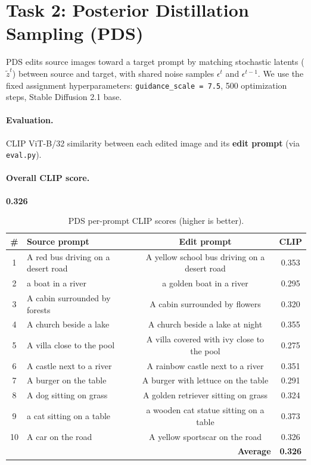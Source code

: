 \documentclass[11pt,a4paper]{article}
\begin{document}
\section{Task 2: Posterior Distillation Sampling (PDS)}

PDS edits source images toward a target prompt by matching stochastic latents
($\tilde{z}^t$) between source and target, with shared noise samples
$\epsilon^t$ and $\epsilon^{t-1}$. We use the fixed assignment hyperparameters:
\texttt{guidance\_scale = 7.5}, 500 optimization steps, Stable Diffusion 2.1 base.

\paragraph{Evaluation.} CLIP ViT-B/32 similarity between each edited image and its
\textbf{edit prompt} (via \texttt{eval.py}).

\paragraph{Overall CLIP score.} \textbf{0.326}

\begin{table}[H]
  \centering
  \caption{PDS per-prompt CLIP scores (higher is better).}
  \label{tab:pds-scores}
  \small
  \begin{tabular}{@{}clcc@{}}
    \toprule
    \# & Source prompt & Edit prompt & CLIP \\
    \midrule
    1  & A red bus driving on a desert road & A yellow school bus driving on a desert road & 0.353 \\
    2  & a boat in a river & a golden boat in a river & 0.295 \\
    3  & A cabin surrounded by forests & A cabin surrounded by flowers & 0.320 \\
    4  & A church beside a lake & A church beside a lake at night & 0.355 \\
    5  & A villa close to the pool & A villa covered with ivy close to the pool & 0.275 \\
    6  & A castle next to a river & A rainbow castle next to a river & 0.351 \\
    7  & A burger on the table & A burger with lettuce on the table & 0.291 \\
    8  & A dog sitting on grass & A golden retriever sitting on grass & 0.324 \\
    9  & a cat sitting on a table & a wooden cat statue sitting on a table & 0.373 \\
    10 & A car on the road & A yellow sportscar on the road & 0.326 \\
    \midrule
    \multicolumn{3}{r}{\textbf{Average}} & \textbf{0.326} \\
    \bottomrule
  \end{tabular}
\end{table}
\end{document}
